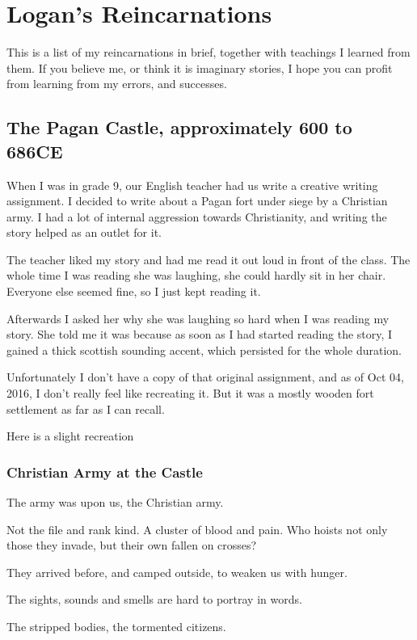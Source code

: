\part{Logan's Reincarnations}
\label{reincarnation}

This is a list of my reincarnations in brief, together with teachings I learned
from them. 
If you believe me, or think it is imaginary stories, 
I hope you can profit from learning from my errors, and successes.

\chapter{The Pagan Castle, approximately 600 to 686CE}
When I was in grade 9, our English teacher had us write a creative writing
assignment. I decided to write about a Pagan fort under siege by a Christian
army.  I had a lot of internal aggression towards Christianity, and writing the
story helped as an outlet for it. 

The teacher liked my story and had me read it out loud in front of the class.
The whole time I was reading she was laughing, she could hardly sit in her
chair. Everyone else seemed fine, so I just kept reading it. 

Afterwards I asked her why she was laughing so hard when I was reading my story. 
She told me it was because as soon as I had started reading the story, I gained
a thick scottish sounding accent, which persisted for the whole duration. 

Unfortunately I don't have a copy of that original assignment, and as of Oct
04, 2016, I don't really feel like recreating it. But it was a mostly wooden 
fort settlement as far as I can recall. 

Here is a slight recreation

\section{Christian Army at the Castle}
The army was upon us, the Christian army.

Not the file and rank kind. A cluster of blood and pain. 
Who hoists not only those they invade, but their own fallen on crosses?

They arrived before, and camped outside, to weaken us with hunger. 

The sights, sounds and smells are hard to portray in words. 

The stripped bodies, the tormented citizens. 


